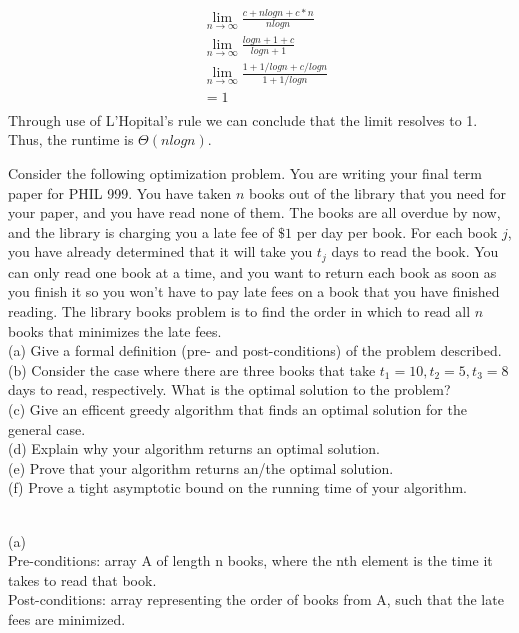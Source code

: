 \documentclass{assignment}
\begin{document}
\begin{problemlist}
\begin{answer}
\begin{align*}
&\lim_{n\rightarrow \infty} \frac{c + nlogn + c * n}{nlogn}\\
&\lim_{n\rightarrow \infty} \frac{logn + 1 + c}{logn + 1}\\
&\lim_{n\rightarrow \infty} \frac{1 + 1/logn + c/logn}{1 + 1/logn}\\
&= 1\\
\end {align*}
Through use of L'Hopital's rule we can conclude that the limit resolves to 1. Thus, the runtime is $\Theta (nlogn)$.
\end{answer}
\clearpage
\pbitem
\begin{problem}
Consider the following optimization problem. You are writing your final term paper for PHIL 999. You have taken $n$ books out of the library that you need for your paper, and you have read none of them. The books are all overdue by now, and the library is charging you a late fee of $\$1$ per day per book. For each book $j$, you have already determined that it will take you $t_j$ days to read the book. You can only read one book at a time, and you want to return each book as soon as you finish it so you won't have to pay late fees on a book that you have finished reading. The library books problem is to find the order in which to read all $n$ books that minimizes the late fees.\\
(a) Give a formal definition (pre- and post-conditions) of the problem described.\\
(b) Consider the case where there are three books that take $t_1=10,t_2=5,t_3=8$ days to read, respectively. What is the optimal solution to the problem?\\
(c) Give an efficent greedy algorithm that finds an optimal solution for the general case.\\
(d) Explain why your algorithm returns an optimal solution.\\
(e) Prove that your algorithm returns an/the optimal solution.\\
(f) Prove a tight asymptotic bound on the running time of your algorithm.\\
\end{problem}
\begin{answer}
\\
(a) \\
Pre-conditions: array A of length n books, where the nth element is the time it takes to read that book.\\
Post-conditions: array representing the order of books from A, such that the late fees are minimized.\\

\end{answer}
\end{problemlist}
\end{document}
